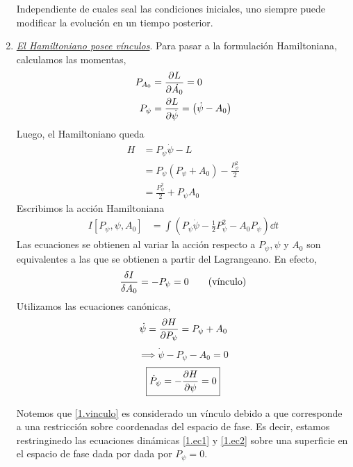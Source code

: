 \begin{ej}
\begin{enumerate}
Independiente de cuales seal las condiciones iniciales, uno siempre puede modificar la evolución en un tiempo posterior.

\item \underline{\textit{El Hamiltoniano posee vínculos}}. Para pasar a la formulación Hamiltoniana, calculamos las momentas,
\begin{align}
  P_{A_0}&=\pdv{L}{\dot{A_0}}=0\\
  P_{\psi}&=\pdv{L}{\dot{\psi}}=\left(\dot{\psi}-A_0\right)
\end{align}
Luego, el Hamiltoniano queda
\begin{align}
  H&=P_\psi \dot{\psi }-L\\
  &=P_\psi(P_\psi+A_0)-\frac{P_\psi^2}{2}\\
  &=\frac{P_\psi^2}{2}+P_\psi A_0
\end{align}
Escribimos la acción Hamiltoniana
\begin{align}
  I[P_\psi,\psi,A_0]&=\int\left(P_\psi \dot{\psi}-\frac{1}{2}P^2_\psi-A_0P_\psi\right)\dd t
\end{align}
Las ecuaciones se obtienen al variar la acción respecto a $P_\psi, \psi$ y $A_0$ son equivalentes a las que se obtienen a partir del Lagrangeano. En efecto,
\begin{equation}\label{1.vinculo}
  \frac{\delta I}{\delta A_0}=-P_\psi=0 \qquad (\text{vínculo})
\end{equation}
Utilizamos las ecuaciones canónicas,
\begin{equation}
  \dot{\psi}=\pdv{H}{P_\psi}=P_\psi+A_0
\end{equation}
\begin{equation}\label{1.ec1}
  \implies \boxed{\dot{\psi}-P_\psi-A_0=0}
\end{equation}
\begin{equation}\label{1.ec2}
  \boxed{\dot{P}_\psi=-\pdv{H}{\psi}=0}
\end{equation}

Notemos que \eqref{1.vinculo} es considerado un vínculo debido a que corresponde a una restricción sobre coordenadas del espacio de fase. Es decir, estamos restringinedo las ecuaciones dinámicas \eqref{1.ec1} y \eqref{1.ec2} sobre una superficie en el espacio de fase dada por dada por $P_\psi=0$.

\end{enumerate}
\end{ej}





































